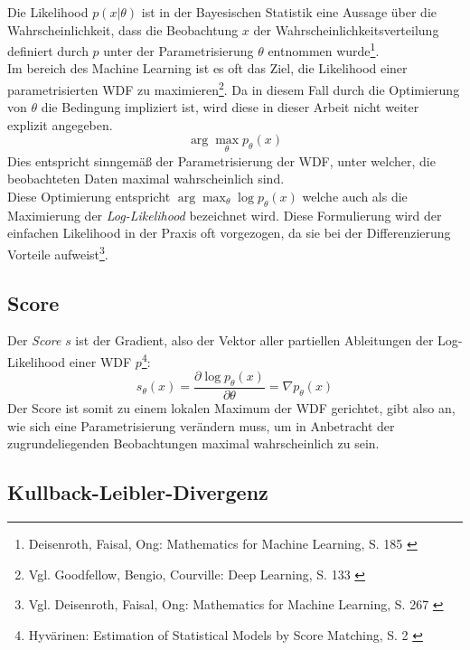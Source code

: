 Die Likelihood $p(x|\theta)$ ist in der Bayesischen Statistik eine Aussage über die Wahrscheinlichkeit, dass die Beobachtung $x$ der Wahrscheinlichkeitsverteilung definiert durch $p$ unter der Parametrisierung $\theta$ entnommen wurde\footnote{
    Deisenroth, Faisal, Ong: Mathematics for Machine Learning, S. 185
    \cite{Deisenroth2020}
}. \\
Im bereich des Machine Learning ist es oft das Ziel, die Likelihood einer parametrisierten \ac{WDF} zu maximieren\footnote{
    Vgl. Goodfellow, Bengio, Courville: Deep Learning, S. 133
    \cite{Goodfellow-et-al-2016}
}. Da in diesem Fall durch die Optimierung von $\theta$ die Bedingung impliziert ist, wird diese in dieser Arbeit nicht weiter explizit angegeben.
\begin{equation}
    \arg\max_\theta p_\theta(x)
\end{equation}
Dies entspricht sinngemäß der Parametrisierung der \ac{WDF}, unter welcher, die beobachteten Daten maximal wahrscheinlich sind. \\
Diese Optimierung entspricht $\arg\max_\theta \log p_\theta(x)$ welche auch als die Maximierung der \textit{Log-Likelihood} bezeichnet wird. Diese Formulierung wird der einfachen Likelihood in der Praxis oft vorgezogen, da sie bei der Differenzierung Vorteile aufweist\footnote{
    Vgl. Deisenroth, Faisal, Ong: Mathematics for Machine Learning, S. 267
    \cite{Deisenroth2020}
}.

\subsection{Score}

Der \textit{Score} $s$ ist der Gradient, also der Vektor aller partiellen Ableitungen der Log-Likelihood einer \ac{WDF} $p$\footnote{
    Hyvärinen: Estimation of Statistical Models by Score Matching, S. 2
    \cite{JMLR:v6:hyvarinen05a}
}: 
\begin{equation}
    s_\theta(x) = \frac{\partial \log p_\theta(x)}{\partial \theta} 
    = \nabla p_\theta(x)
\end{equation}
Der Score ist somit zu einem lokalen Maximum der \ac{WDF} gerichtet, gibt also an, wie sich eine Parametrisierung verändern muss, um in Anbetracht der zugrundeliegenden Beobachtungen maximal wahrscheinlich zu sein.

\subsection{Kullback-Leibler-Divergenz}

